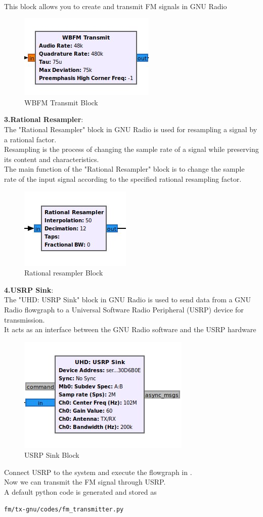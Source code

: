 \begin{enumerate}[label=\arabic*.,ref=\thesection.\theenumi]
\\
This block allows you to create and transmit FM 
signals in GNU Radio
\begin{figure}[H]
\centering
\includegraphics[width=0.3\columnwidth]{fm/tx-gnu/figs/wbfm-tx.jpg}
\caption{WBFM Transmit Block}
\label{fig:wbfm_tx}
\end{figure}
\textbf{3.Rational Resampler}:\\
The "Rational Resampler" block in GNU Radio is used for resampling a signal by a rational factor.
\\
Resampling is the process of changing the sample rate of a signal while preserving its content and characteristics.
\\
The main function of the "Rational Resampler" block is to change the sample rate of the input signal according to the specified rational 
resampling factor.
\begin{figure}[H]
\centering
\includegraphics[width=0.3\columnwidth]{fm/tx-gnu/figs/resampler.jpg}
\caption{Rational resampler Block}
\label{fig:Rational resampler block}
\end{figure}
\textbf{4.USRP Sink}:\\
The "UHD: USRP Sink" block in GNU Radio is used to send data from a GNU Radio flowgraph to a Universal Software Radio Peripheral (USRP) device for transmission.
\\
It acts as an interface between the GNU Radio software and the USRP hardware
\begin{figure}[H]
\centering
\includegraphics[width=0.3\columnwidth]{fm/tx-gnu/figs/usrp-sink.jpg}
\caption{USRP Sink Block}
\label{fig:audio sink block}
\end{figure}
Connect USRP to the system and execute the flowgraph in .\\
Now we can transmit the FM signal through USRP.\\
A default python code is generated and stored as
\begin{lstlisting}
fm/tx-gnu/codes/fm_transmitter.py
\end{lstlisting}
\end{enumerate}